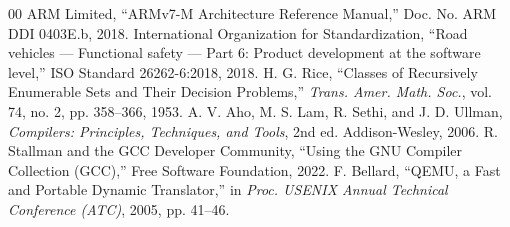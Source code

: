 \documentclass[conference]{IEEEtran}
\begin{document}
\begin{thebibliography}{00}
 ARM Limited, ``ARMv7-M Architecture Reference Manual,'' Doc. No. ARM DDI 0403E.b, 2018.
 International Organization for Standardization, ``Road vehicles --- Functional safety --- Part 6: Product development at the software level,'' ISO Standard 26262-6:2018, 2018.
 H. G. Rice, ``Classes of Recursively Enumerable Sets and Their Decision Problems,'' \textit{Trans. Amer. Math. Soc.}, vol. 74, no. 2, pp. 358--366, 1953.
 A. V. Aho, M. S. Lam, R. Sethi, and J. D. Ullman, \textit{Compilers: Principles, Techniques, and Tools}, 2nd ed. Addison-Wesley, 2006.
 R. Stallman and the GCC Developer Community, ``Using the GNU Compiler Collection (GCC),'' Free Software Foundation, 2022.
 F. Bellard, ``QEMU, a Fast and Portable Dynamic Translator,'' in \textit{Proc. USENIX Annual Technical Conference (ATC)}, 2005, pp. 41--46.
\end{thebibliography}
\end{document}

